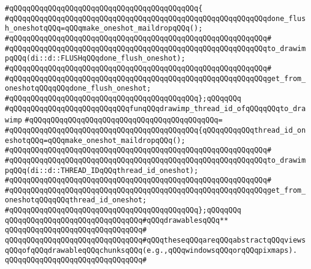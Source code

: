 \verb|#qQQqqQQqqQQqqQQqqQQqqQQqqQQqqQQqqQQqqQQqqQQq{|\newline
\verb|#qQQqqQQqqQQqqQQqqQQqqQQqqQQqqQQqqQQqqQQqqQQqqQQqqQQqqQQqqQQqdone_flush_oneshotqQQq=qQQqmake_oneshot_maildropqQQq();|\newline
\verb|#qQQqqQQqqQQqqQQqqQQqqQQqqQQqqQQqqQQqqQQqqQQqqQQqqQQqqQQqqQQq#|\newline
\verb|#qQQqqQQqqQQqqQQqqQQqqQQqqQQqqQQqqQQqqQQqqQQqqQQqqQQqqQQqqQQqto_drawimpqQQq(di::d::FLUSHqQQqdone_flush_oneshot);|\newline
\verb|#qQQqqQQqqQQqqQQqqQQqqQQqqQQqqQQqqQQqqQQqqQQqqQQqqQQqqQQqqQQq#|\newline
\verb|#qQQqqQQqqQQqqQQqqQQqqQQqqQQqqQQqqQQqqQQqqQQqqQQqqQQqqQQqqQQqget_from_oneshotqQQqqQQqdone_flush_oneshot;|\newline
\verb|#qQQqqQQqqQQqqQQqqQQqqQQqqQQqqQQqqQQqqQQqqQQq};qQQqqQQq|\newline
\newline
\verb|#qQQqqQQqqQQqqQQqqQQqqQQqqQQqfunqQQqdrawimp_thread_id_ofqQQqqQQqto_drawimp|\newline
\verb|#qQQqqQQqqQQqqQQqqQQqqQQqqQQqqQQqqQQqqQQqqQQq=|\newline
\verb|#qQQqqQQqqQQqqQQqqQQqqQQqqQQqqQQqqQQqqQQqqQQq{qQQqqQQqqQQqthread_id_oneshotqQQq=qQQqmake_oneshot_maildropqQQq();|\newline
\verb|#qQQqqQQqqQQqqQQqqQQqqQQqqQQqqQQqqQQqqQQqqQQqqQQqqQQqqQQqqQQq#|\newline
\verb|#qQQqqQQqqQQqqQQqqQQqqQQqqQQqqQQqqQQqqQQqqQQqqQQqqQQqqQQqqQQqto_drawimpqQQq(di::d::THREAD_IDqQQqthread_id_oneshot);|\newline
\verb|#qQQqqQQqqQQqqQQqqQQqqQQqqQQqqQQqqQQqqQQqqQQqqQQqqQQqqQQqqQQq#|\newline
\verb|#qQQqqQQqqQQqqQQqqQQqqQQqqQQqqQQqqQQqqQQqqQQqqQQqqQQqqQQqqQQqget_from_oneshotqQQqqQQqthread_id_oneshot;|\newline
\verb|#qQQqqQQqqQQqqQQqqQQqqQQqqQQqqQQqqQQqqQQqqQQq};qQQqqQQq|\newline
\newline
\verb|qQQqqQQqqQQqqQQqqQQqqQQqqQQqqQQq#qQQqdrawablesqQQq**|\newline
\verb|qQQqqQQqqQQqqQQqqQQqqQQqqQQqqQQq#|\newline
\verb|qQQqqQQqqQQqqQQqqQQqqQQqqQQqqQQq#qQQqtheseqQQqareqQQqabstractqQQqviewsqQQqofqQQqdrawableqQQqchunksqQQq(e.g.,qQQqwindowsqQQqorqQQqpixmaps).|\newline
\verb|qQQqqQQqqQQqqQQqqQQqqQQqqQQqqQQq#|\newline
